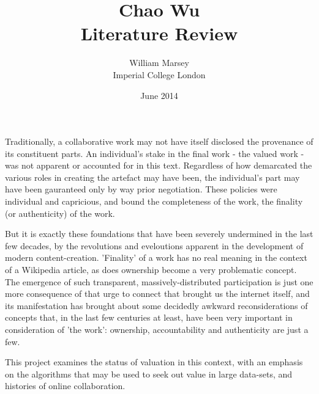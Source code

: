 \documentclass[a4paper,11pt,twoside,notitlepage]{report}
\renewenvironment{abstract}
 {
	\small
  	\begin{center}
  	\bfseries \abstractname\vspace{-.5em}\vspace{0pt}
  	\end{center}
  	\list{}{
    	\setlength{\leftmargin}{.5cm}%
    	\setlength{\rightmargin}{\leftmargin}%
  	}%
  	\item\relax}
 	{\endlist}
\begin{document}
	\title{Chao Wu
		\\ \small Literature Review}
	\author{William Marsey
		\\Imperial College London}
	\date{June 2014}
 	\maketitle
	

	\begin{framed}
		\begin{abstract}
			Traditionally, a collaborative work may not
                        have itself disclosed the provenance of its constituent
                        parts. An individual's stake in the
                        final work - the valued work - was not
                        apparent or accounted for in this
                        text. Regardless of how demarcated the various
                        roles in creating the artefact may have
                        been, the individual's part may have been
                        gauranteed only by way prior
                        negotiation. These policies were individual
                        and capricious, and bound the completeness of the work,
                        the finality (or authenticity) of the
                        work. 

                        But it is exactly these foundations that
                        have been severely undermined in the last few
                        decades, by the revolutions and eveloutions
                        apparent in the development of modern
                        content-creation. 'Finality' of a work has no
                        real meaning in the context of a Wikipedia
                        article, as does ownership become a very
                        problematic concept. The emergence of
                        such transparent, massively-distributed
                        participation is just one more consequence of
                        that urge to connect that brought us the
                        internet itself, and its manifestation has
                        brought about some decidedly awkward
                        reconsiderations of concepts
                        that, in the last few centuries at least, have
                        been very important in consideration of 'the
                        work': ownership, accountability and
                        authenticity are just a few.

                        This project examines the status of valuation
                        in this context, with an emphasis on the
                        algorithms that may be used to seek out value
                        in large data-sets, and histories of online
                        collaboration.
		\end{abstract}
	\end{framed}
\end{document}
